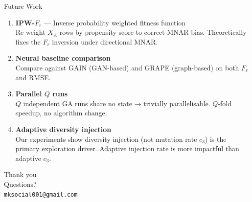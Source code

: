 \documentclass[aspectratio=169,12pt]{beamer}
\begin{document}
\begin{frame}{Future Work}

\begin{enumerate}
  \item \textbf{IPW-$F_r$} — Inverse probability weighted fitness function \\
        {\small Re-weight $X_A$ rows by propensity score to correct MNAR bias. Theoretically fixes the $F_r$ inversion under directional MNAR.}

  \bigskip
  \item \textbf{Neural baseline comparison} \\
        {\small Compare against GAIN (GAN-based) and GRAPE (graph-based) on both $F_r$ and RMSE.}

  \bigskip
  \item \textbf{Parallel $Q$ runs} \\
        {\small $Q$ independent GA runs share no state → trivially parallelisable. $Q$-fold speedup, no algorithm change.}

  \bigskip
  \item \textbf{Adaptive diversity injection} \\
        {\small Our experiments show diversity injection (not mutation rate $c_3$) is the primary exploration driver. Adaptive injection rate is more impactful than adaptive $c_3$.}
\end{enumerate}

\end{frame}

\begin{frame}[plain]
\begin{center}
{\LARGE Thank you}\\[1cm]
{\large Questions?}\\[2cm]
{\normalsize \texttt{mksocial001@gmail.com}}
\end{center}
\end{frame}


\appendix
\end{document}
